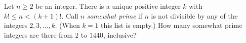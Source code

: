 Let $n\ge 2$ be an integer. There is a unique positive integer $k$ with $k!\le n<(k+1)!$. Call $n$ \emph{somewhat prime} if $n$ is not divisible by any of the integers $2,3,\dots,k$. (When $k=1$ this list is empty.) How many somewhat prime integers are there from $2$ to $1440$, inclusive?
